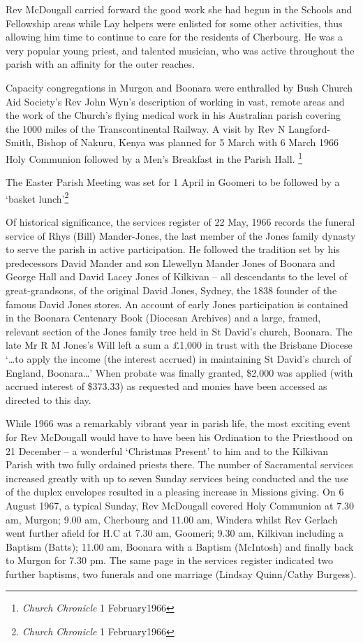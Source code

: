 Rev McDougall carried forward the good work she had begun in the Schools and Fellowship areas while Lay helpers were enlisted for some other activities, thus allowing him time to continue to care for the residents of Cherbourg. He was a very popular young priest, and talented musician, who was active throughout the parish with an affinity for the outer reaches.

Capacity congregations in Murgon and Boonara were enthralled by Bush Church Aid Society's Rev John Wyn's description of working in vast, remote areas and the work of the Church's flying medical work in his Australian parish covering the 1000 miles of the Transcontinental Railway. A visit by Rev N Langford-Smith, Bishop of Nakuru, Kenya was planned for 5 March with 6 March 1966 Holy Communion followed by a Men's Breakfast in the Parish Hall. \footnote{\emph{Church Chronicle} 1 February1966}

The Easter Parish Meeting was set for 1 April in Goomeri to be followed by a `basket lunch'\footnote{\emph{Church Chronicle} 1 February1966}

Of historical significance, the services register of 22 May, 1966 records the funeral service of Rhys (Bill) Mander-Jones, the last member of the Jones family dynasty to serve the parish in active participation. He followed the tradition set by his predecessors David Mander and son Llewellyn Mander Jones of Boonara and George Hall and David Lacey Jones of Kilkivan -- all descendants to the level of great-grandsons, of the original David Jones, Sydney, the 1838 founder of the famous David Jones stores. An account of early Jones participation is contained in the Boonara Centenary Book (Diocesan Archives) and a large, framed, relevant section of the Jones family tree held in St David's church, Boonara. The late Mr R M Jones's Will left a sum a £1,000 in trust with the Brisbane Diocese `\ldots to apply the income (the interest accrued) in maintaining St David's church of England, Boonara\ldots' When probate was finally granted, \$2,000 was applied (with accrued interest of \$373.33) as requested and monies have been accessed as directed to this day.

While 1966 was a remarkably vibrant year in parish life, the most exciting event for Rev McDougall would have to have been his Ordination to the Priesthood on 21 December -- a wonderful `Christmas Present' to him and to the Kilkivan Parish with two fully ordained priests there. The number of Sacramental services increased greatly with up to seven Sunday services being conducted and the use of the duplex envelopes resulted in a pleasing increase in Missions giving. On 6 August 1967, a typical Sunday, Rev McDougall covered Holy Communion at 7.30 am, Murgon; 9.00 am, Cherbourg and 11.00 am, Windera whilst Rev Gerlach went further afield for H.C at 7.30 am, Goomeri; 9.30 am, Kilkivan including a Baptism (Batts); 11.00 am, Boonara with a Baptism (McIntosh) and finally back to Murgon for 7.30 pm. The same page in the services register indicated two further baptisms, two funerals and one marriage (Lindsay Quinn/Cathy Burgess).

